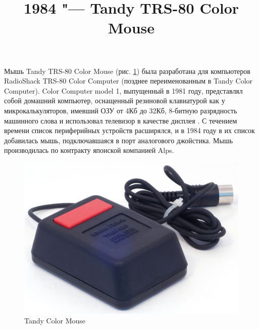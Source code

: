 \documentclass[11pt, a4paper]{article}
\begin{document}
\title{1984 "--- Tandy TRS-80 Color Mouse}
\date{}
\maketitle
{}
Мышь Tandy TRS-80 Color Mouse (рис. \ref{fig:TandyColorMousePic}) была разработана для компьютеров RadioShack TRS-80 Color Computer (позднее переименованным в Tandy Color Computer). Color Computer model 1, выпущенный в 1981 году, представлял собой домашний компьютер, оснащенный резиновой клавиатурой как у микрокалькуляторов, имевший ОЗУ от 4Кб до 32Кб, 8-битную разрядность машинного слова и использовал телевизор в качестве дисплея \cite{wiki}. С течением времени список периферийных устройств расширялся, и в 1984 году в их список добавилась мышь\cite{adv}, подключавшаяся в порт аналогового джойстика. Мышь производилась по контракту японской компанией Alps.

\begin{figure}[h]
    \centering
    \includegraphics[scale=0.6]{1984_tandy_trs80_color_mouse/pic_30.jpg}
    \caption{Tandy Color Mouse}
    \label{fig:TandyColorMousePic}
\end{figure}
\end{document}
